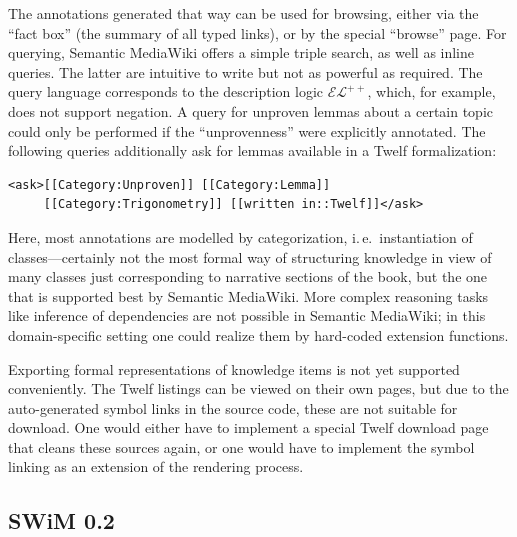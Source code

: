 The annotations generated that way can be used for browsing, either via the
``fact box'' (the summary of all typed links), or by the special ``browse''
page.  For querying, Semantic MediaWiki offers a simple triple search, as well
as inline queries.  The latter are intuitive to write but not as powerful as
required.  The query language corresponds to the description logic
$\mathcal{EL}^{++}$\cite{KrSchVr:semwiki-reasoning07}, which, for example, does
not support negation.  A query for unproven lemmas about a certain topic could
only be performed if the ``unprovenness'' were explicitly annotated.  The
following queries additionally ask for lemmas available in a Twelf formalization:


\begin{lstlisting}
<ask>[[Category:Unproven]] [[Category:Lemma]]
     [[Category:Trigonometry]] [[written in::Twelf]]</ask>
\end{lstlisting}

Here, most annotations are modelled by categorization, i.\,e.\ instantiation of
classes---certainly not the most formal way of structuring knowledge in view of
many classes just corresponding to narrative sections of the book, but the one
that is supported best by Semantic MediaWiki.  More complex reasoning tasks like
inference of dependencies are not possible in Semantic MediaWiki; in this
domain-specific setting one could realize them by hard-coded extension
functions.

Exporting formal representations of knowledge items is not yet supported
conveniently.  The Twelf listings can be viewed on their own pages, but due to
the auto-generated symbol links in the source code, these are not suitable for
download.  One would either have to implement a special Twelf download page that
cleans these sources again, or one would have to implement the symbol linking as
an extension of the rendering process.

\subsection{SWiM 0.2}
\label{sec:swim}

